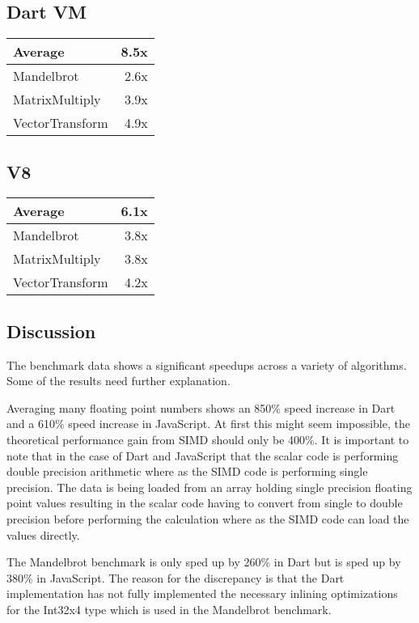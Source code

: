 \documentclass[preprint]{sigplanconf}
\begin{document}
\subsection{Dart VM}
\begin{tabular}{|l|r|}
\hline
 Average & 8.5x \\
 \hline
 Mandelbrot & 2.6x \\
 \hline
 MatrixMultiply & 3.9x \\
 \hline
 VectorTransform & 4.9x \\
 \hline
\end{tabular}

\subsection{V8}
\begin{tabular}{|l|r|}
\hline
 Average & 6.1x \\
 \hline
 Mandelbrot & 3.8x \\
 \hline
 MatrixMultiply & 3.8x \\
 \hline
 VectorTransform & 4.2x \\
 \hline
\end{tabular}

\subsection{Discussion}

The benchmark data shows a significant speedups across a variety of algorithms.
Some of the results need further explanation.

Averaging many floating point numbers shows an 850\% speed increase in Dart and
a 610\% speed increase in JavaScript. At first this might seem impossible, the
theoretical performance gain from SIMD should only be 400\%. It is important to
note that in the case of Dart and JavaScript that the scalar code is performing
double precision arithmetic where as the SIMD code is performing single
precision. The data is being loaded from an array holding single precision
floating point values resulting in the scalar code having to convert from single
to double precision before performing the calculation where as the SIMD code can
load the values directly.

The Mandelbrot benchmark is only sped up by 260\% in Dart but is sped up by
380\% in JavaScript. The reason for the discrepancy is that the Dart
implementation has not fully implemented the necessary inlining optimizations
for the Int32x4 type which is used in the Mandelbrot benchmark.
\end{document}
